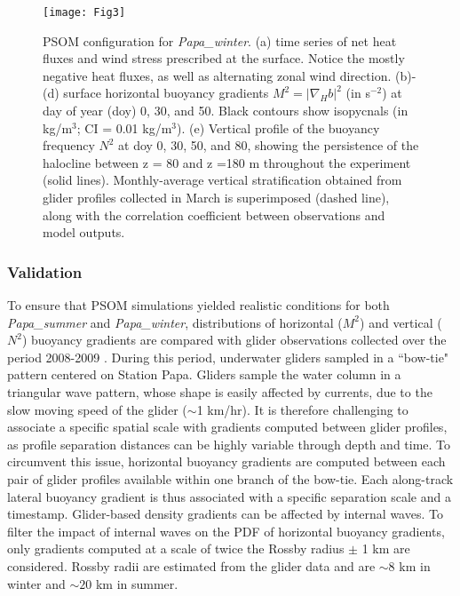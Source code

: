 \documentclass[article,linenumbers]{agujournal2019}
\begin{document}
	\begin{figure}[ht]
		\texttt{[image: Fig3]}
		\caption{PSOM configuration for \textit{Papa\_winter}. (a) time series of net heat fluxes and wind stress prescribed at the surface. Notice the mostly negative heat fluxes, as well as alternating zonal wind direction. (b)-(d) surface horizontal buoyancy gradients $M^2 = |\nabla_Hb|^2$ (in s$^{-2}$) at day of year (doy) 0, 30, and 50. Black contours show isopycnals (in kg/m$^3$; CI = 0.01 kg/m$^3$). (e) Vertical profile of the buoyancy frequency $N^2$ at doy 0, 30, 50, and 80, showing the persistence of the halocline between z = 80 and z =180 m throughout the experiment (solid lines). Monthly-average vertical stratification obtained from glider profiles collected in March is superimposed (dashed line), along with the correlation coefficient between observations and model outputs.}
		\label{fig: Papa_winter}
	\end{figure}


	\subsubsection{Validation}
	\label{sec: glider_validation}

	To ensure that PSOM simulations yielded realistic conditions for both \textit{Papa\_summer} and \textit{Papa\_winter}, distributions of horizontal ($M^2$) and vertical ($N^2$) buoyancy gradients are compared with glider observations collected over the period 2008-2009 \cite{Pelland_2016}.
	During this period, underwater gliders sampled in a ``bow-tie" pattern centered on Station Papa. Gliders sample the water column in a triangular wave pattern, whose shape is easily affected by currents, due to the slow moving speed of the glider ($\sim$1 km/hr). It is therefore challenging to associate a specific spatial scale with gradients computed between glider profiles, as profile separation distances can be highly variable through depth and time. To circumvent this issue, horizontal buoyancy gradients are computed between each pair of glider profiles available within one branch of the bow-tie. Each along-track lateral buoyancy gradient is thus associated with a specific separation scale and a timestamp. Glider-based density gradients can be affected by internal waves. To filter the impact of internal waves on the PDF of horizontal buoyancy gradients, only gradients computed at a scale of twice the Rossby radius $\pm$ 1 km are considered. Rossby radii are estimated from the glider data and are $\sim8$ km in winter and $\sim20$ km in summer.
\end{document}

